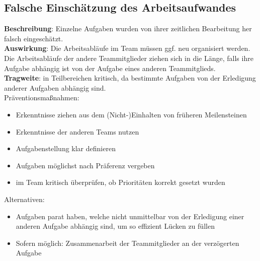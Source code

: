 \documentclass[a4paper, 12pt, titlepage]{scrartcl}
\begin{document}
	\subsection{Falsche Einsch\"atzung des Arbeitsaufwandes}
		\textbf{Beschreibung}: Einzelne Aufgaben wurden von ihrer zeitlichen Bearbeitung her falsch eingesch\"atzt.\\
		\textbf{Auswirkung}: Die Arbeitsabl\"aufe im Team m\"ussen ggf. neu organisiert werden. Die Arbeitsabl\"aufe der andere Teammitglieder ziehen sich in die L\"ange, falls ihre Aufgabe abh\"angig ist von der Aufgabe eines anderen Teammitglieds.\\
		\textbf{Tragweite}: in Teilbereichen kritisch, da bestimmte Aufgaben von der Erledigung anderer Aufgaben abh\"angig sind.\\
		Pr\"aventionsma\ss nahmen:
			\begin{itemize}
				\item Erkenntnisse ziehen aus dem (Nicht-)Einhalten von fr\"uheren Meilensteinen
				\item Erkenntnisse der anderen Teams nutzen
				\item Aufgabenstellung klar definieren
				\item Aufgaben m\"oglichst nach Pr\"aferenz vergeben
				\item im Team kritisch \"uberpr\"ufen, ob Priorit\"aten korrekt gesetzt wurden
			\end{itemize}
		Alternativen: 
			\begin{itemize}
				\item Aufgaben parat haben, welche nicht unmittelbar von der Erledigung einer anderen Aufgabe abh\"angig sind, um so effizient L\"ucken zu f\"ullen
				\item Sofern m\"oglich: Zusammenarbeit der Teammitglieder an der verz\"ogerten Aufgabe
			\end{itemize}
		
\end{document}
